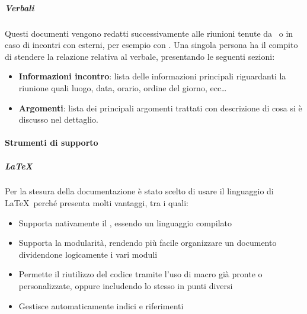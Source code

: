 


			\subparagraph{Verbali}
			Questi documenti vengono redatti successivamente alle riunioni tenute da \gruppo\
			o in caso di incontri con  esterni, per esempio con \II. Una singola persona ha il compito di stendere
			la relazione relativa al verbale, presentando le seguenti sezioni:
			\begin{itemize}
				\item \textbf{Informazioni incontro}: lista delle informazioni principali riguardanti la riunione quali luogo, data, orario, ordine del giorno, ecc\dots
				\item \textbf{Argomenti}: lista dei principali argomenti trattati con descrizione di cosa si è discusso nel dettaglio.
			\end{itemize}


			\paragraph{Strumenti di supporto}

			\subparagraph{\LaTeX} \label{LaTeX}
			Per la stesura della documentazione è stato scelto di usare il linguaggio di  \LaTeX \ perché presenta molti vantaggi, tra i quali:
			\begin{itemize}
				\item Supporta nativamente il , essendo un linguaggio compilato
				\item Supporta la modularità, rendendo più facile organizzare un documento dividendone logicamente i vari moduli
				\item Permette il riutilizzo del codice tramite l'uso di macro già pronte o personalizzate, oppure includendo lo stesso  in punti diversi
				\item Gestisce automaticamente indici e riferimenti
			\end{itemize}

